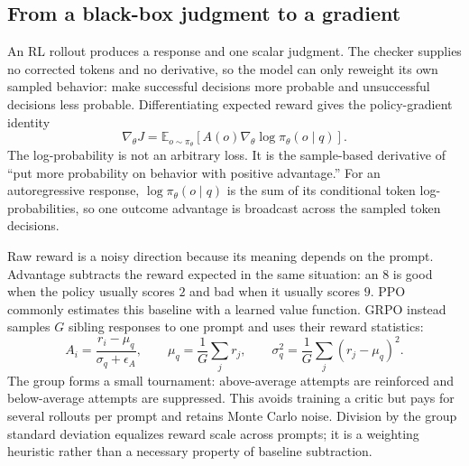 \subsection{From a black-box judgment to a gradient}

An RL rollout produces a response and one scalar judgment. The checker supplies no
corrected tokens and no derivative, so the model can only reweight its own sampled
behavior: make successful decisions more probable and unsuccessful decisions less
probable. Differentiating expected reward gives the policy-gradient identity
\begin{equation}
  \nabla_\theta J
  =\mathbb{E}_{o\sim\pi_\theta}
    \left[A(o)\nabla_\theta\log\pi_\theta(o\mid q)\right].
  \label{eq:compact-policy-gradient}
\end{equation}
The log-probability is not an arbitrary loss. It is the sample-based derivative of ``put
more probability on behavior with positive advantage.'' For an autoregressive response,
$\log\pi_\theta(o\mid q)$ is the sum of its conditional token log-probabilities, so one
outcome advantage is broadcast across the sampled token decisions.

Raw reward is a noisy direction because its meaning depends on the prompt. Advantage
subtracts the reward expected in the same situation: an $8$ is good when the policy
usually scores $2$ and bad when it usually scores $9$. PPO commonly estimates this
baseline with a learned value function. GRPO instead samples $G$ sibling responses to one
prompt and uses their reward statistics:
\begin{equation}
  A_i=\frac{r_i-\mu_q}{\sigma_q+\epsilon_A},
  \qquad
  \mu_q=\frac{1}{G}\sum_j r_j,
  \qquad
  \sigma_q^2=\frac{1}{G}\sum_j(r_j-\mu_q)^2.
  \label{eq:compact-grpo-advantage}
\end{equation}
The group forms a small tournament: above-average attempts are reinforced and
below-average attempts are suppressed. This avoids training a critic but pays for several
rollouts per prompt and retains Monte Carlo noise. Division by the group standard deviation
equalizes reward scale across prompts; it is a weighting heuristic rather than a necessary
property of baseline subtraction.
